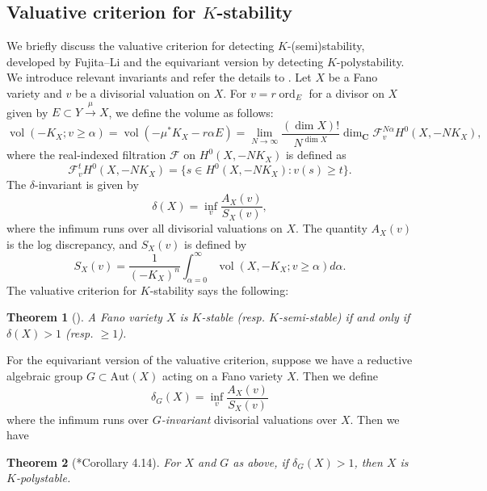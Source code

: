 \documentclass[letterpaper,11pt]{amsart}
\theoremstyle{plain}
\newtheorem{theo}{Theorem}[section]
\theoremstyle{definition}
\theoremstyle{remark}
\newcommand{\CC}{\mathbf{C}}
\newcommand{\cF}{\mathcal{F}}
\newcommand{\sta}{^{*}}
\DeclareMathOperator{\vol}{vol}
\DeclareMathOperator{\ord}{ord}
\begin{document}
    \subsection{Valuative criterion for $K$-stability}
    We briefly discuss the valuative criterion for detecting $K$-(semi)stability, developed by Fujita--Li \cite{Fujita-valuative, ChiLi-K-ss-volmin} and the equivariant version by \cite{Zhuang-equivariant} detecting $K$-polystability. We introduce relevant invariants and refer the details to \cite{Blum-Jonsson:thersholds}. Let $X$ be a Fano variety and $v$ be a divisorial valuation on $X$. For $v = r \ord_{E}$ for a divisor on $X$ given by $E \subset Y \xrightarrow{\mu} X$, we define the volume as follows:
    $$ \vol(-K_X ; v \geq \alpha) = \vol(- \mu\sta K_X - r\alpha E) = \lim_{N \to \infty} \frac{(\dim X)!}{N^{\dim X}} \dim_{\CC} \cF_{v}^{N\alpha} H^{0}(X, -NK_X), $$
    where the real-indexed filtration $\cF$ on $H^{0}(X, -NK_X)$ is defined as
    $$ \cF_{v}^{ t} H^{0}(X, -NK_X) = \{ s \in H^{0}(X, -NK_X) : v(s) \geq t\}.$$ 
    The $\delta$-invariant is given by
    $$ \delta(X) = \inf_{v} \frac{A_{X}(v)}{S_{X}(v)}, $$
    where the infimum runs over all divisorial valuations on $X$. The quantity $A_{X}(v)$ is the log discrepancy, and $S_{X}(v)$ is defined by
    $$ S_{X}(v) = \frac{1}{(-K_{X})^{n}} \int_{\alpha = 0}^{\infty} \vol(X, -K_X; v \geq \alpha) d\alpha.$$
	The valuative criterion for $K$-stability says the following:
    \begin{theo}[\cite{Fujita-valuative, ChiLi-K-ss-volmin, Blum-Jonsson:thersholds, Liu-Xu-Zhuang:finite-generation}]
        A Fano variety $X$ is $K$-stable (resp. $K$-semi-stable) if and only if $\delta (X) > 1$ (resp. $\geq 1$). 
    \end{theo}
    For the equivariant version of the valuative criterion, suppose we have a reductive algebraic group $G \subset \mathrm{Aut}(X)$ acting on a Fano variety $X$. Then we define
    $$ \delta_{G}(X) = \inf_{v} \frac{A_X(v)}{S_X(v)}$$
    where the infimum runs over \textit{$G$-invariant} divisorial valuations over $X$. Then we have
    \begin{theo}[\cite{Zhuang-equivariant}*{Corollary 4.14}] \label{theo:Zhuang-equivariant-K-polystable}
        For $X$ and $G$ as above, if $\delta_{G}(X) > 1$, then $X$ is $K$-polystable.
    \end{theo}
\end{document}

